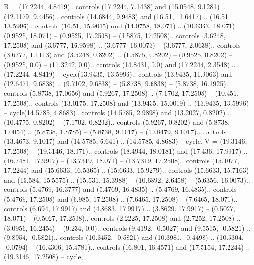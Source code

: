 {B} = {(17.2244, 4.8419).. controls (17.2244, 7.1438) and (15.0548, 9.1281) .. (12.1179, 9.4456).. controls (14.6844, 9.9483) and (16.51, 11.6417) .. (16.51, 13.5996).. controls (16.51, 15.9015) and (14.0758, 18.071) .. (10.6363, 18.071) -- (0.9525, 18.071) -- (0.9525, 17.2508) -- (1.5875, 17.2508).. controls (3.6248, 17.2508) and (3.6777, 16.9598) .. (3.6777, 16.0073) -- (3.6777, 2.0638).. controls (3.6777, 1.1113) and (3.6248, 0.8202) .. (1.5875, 0.8202) -- (0.9525, 0.8202) -- (0.9525, 0.0) -- (11.3242, 0.0).. controls (14.8431, 0.0) and (17.2244, 2.3548) .. (17.2244, 4.8419) -- cycle(13.9435, 13.5996).. controls (13.9435, 11.9063) and (12.6471, 9.6838) .. (9.7102, 9.6838) -- (5.8738, 9.6838) -- (5.8738, 16.1925).. controls (5.8738, 17.0656) and (5.9267, 17.2508) .. (7.1702, 17.2508) -- (10.451, 17.2508).. controls (13.0175, 17.2508) and (13.9435, 15.0019) .. (13.9435, 13.5996) -- cycle(14.5785, 4.8683).. controls (14.5785, 2.9898) and (13.2027, 0.8202) .. (10.4775, 0.8202) -- (7.1702, 0.8202).. controls (5.9267, 0.8202) and (5.8738, 1.0054) .. (5.8738, 1.8785) -- (5.8738, 9.1017) -- (10.8479, 9.1017).. controls (13.4673, 9.1017) and (14.5785, 6.641) .. (14.5785, 4.8683) -- cycle},
{V} = {(19.3146, 17.2508) -- (19.3146, 18.071).. controls (18.4944, 18.0181) and (17.436, 17.9917) .. (16.7481, 17.9917) -- (13.7319, 18.071) -- (13.7319, 17.2508).. controls (15.1077, 17.2244) and (15.6633, 16.5365) .. (15.6633, 15.9279).. controls (15.6633, 15.7163) and (15.584, 15.5575) .. (15.531, 15.3988) -- (10.6892, 2.6458) -- (5.6356, 16.0073).. controls (5.4769, 16.3777) and (5.4769, 16.4835) .. (5.4769, 16.4835).. controls (5.4769, 17.2508) and (6.985, 17.2508) .. (7.6465, 17.2508) -- (7.6465, 18.071).. controls (6.694, 17.9917) and (4.8683, 17.9917) .. (3.8629, 17.9917) -- (0.5027, 18.071) -- (0.5027, 17.2508).. controls (2.2225, 17.2508) and (2.7252, 17.2508) .. (3.0956, 16.2454) -- (9.234, 0.0).. controls (9.4192, -0.5027) and (9.5515, -0.5821) .. (9.8954, -0.5821).. controls (10.3452, -0.5821) and (10.3981, -0.4498) .. (10.5304, -0.0794) -- (16.4306, 15.4781).. controls (16.801, 16.4571) and (17.5154, 17.2244) .. (19.3146, 17.2508) -- cycle},
